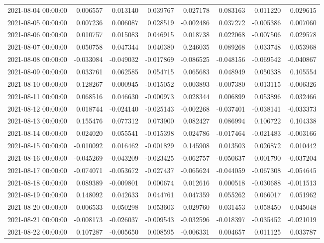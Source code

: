 \begin{tabular}{lrrrrrrr}
2021-08-04 00:00:00 & 0.006557 & 0.013140 & 0.039767 & 0.027178 & 0.083163 & 0.011220 & 0.029615 \\
2021-08-05 00:00:00 & 0.007236 & 0.006087 & 0.028519 & -0.002486 & 0.037272 & -0.005386 & 0.007060 \\
2021-08-06 00:00:00 & 0.010757 & 0.015083 & 0.046915 & 0.018738 & 0.022068 & -0.007506 & 0.029578 \\
2021-08-07 00:00:00 & 0.050758 & 0.047344 & 0.040380 & 0.246035 & 0.089268 & 0.033748 & 0.053968 \\
2021-08-08 00:00:00 & -0.033084 & -0.049032 & -0.017869 & -0.086525 & -0.048156 & -0.069542 & -0.040867 \\
2021-08-09 00:00:00 & 0.033761 & 0.062585 & 0.054715 & 0.065683 & 0.048949 & 0.050338 & 0.105554 \\
2021-08-10 00:00:00 & 0.128267 & 0.000945 & -0.015052 & 0.003893 & -0.007380 & 0.013115 & -0.006326 \\
2021-08-11 00:00:00 & 0.068516 & 0.046630 & -0.000973 & 0.028344 & 0.006899 & 0.053896 & 0.032466 \\
2021-08-12 00:00:00 & 0.018744 & -0.024140 & -0.025143 & -0.002268 & -0.037401 & -0.038141 & -0.033373 \\
2021-08-13 00:00:00 & 0.155476 & 0.077312 & 0.073900 & 0.082427 & 0.086994 & 0.106722 & 0.104338 \\
2021-08-14 00:00:00 & 0.024020 & 0.055541 & -0.015398 & 0.024786 & -0.017464 & -0.021483 & -0.003166 \\
2021-08-15 00:00:00 & -0.010092 & 0.016462 & -0.001829 & 0.145908 & 0.013503 & 0.026872 & 0.010442 \\
2021-08-16 00:00:00 & -0.045269 & -0.043209 & -0.023425 & -0.062757 & -0.050637 & 0.001790 & -0.037204 \\
2021-08-17 00:00:00 & -0.074071 & -0.053672 & -0.027437 & -0.065624 & -0.044059 & -0.067308 & -0.054645 \\
2021-08-18 00:00:00 & 0.089389 & -0.009801 & 0.000674 & 0.012616 & 0.000518 & -0.030688 & -0.011513 \\
2021-08-19 00:00:00 & 0.148092 & 0.042633 & 0.044761 & 0.047359 & 0.055262 & 0.066017 & 0.051962 \\
2021-08-20 00:00:00 & 0.006533 & 0.050298 & 0.053603 & 0.029760 & 0.031453 & 0.058450 & 0.045048 \\
2021-08-21 00:00:00 & -0.008173 & -0.026037 & -0.009543 & -0.032596 & -0.018397 & -0.035452 & -0.021019 \\
2021-08-22 00:00:00 & 0.107287 & -0.005650 & 0.008595 & -0.006331 & 0.004657 & 0.011125 & 0.033787 \\

\end{tabular}
